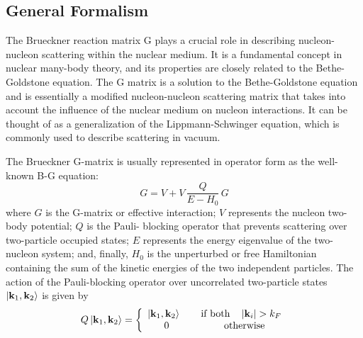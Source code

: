 \documentclass[aps,twocolumn,showpacs,preprintnumbers,amsmath,amssymb,nofootinbib,superscriptaddress,showkeys,noeprint]{revtex4-1}
\newcommand{\nk}{{\bf k}}
\begin{document}
\subsection{General Formalism}\label{sect:general}
The Brueckner reaction matrix G plays a crucial role in describing
nucleon-nucleon scattering within the nuclear medium. It is a
fundamental concept in nuclear many-body theory, and its properties
are closely related to the Bethe-Goldstone equation. The G matrix is a
solution to the Bethe-Goldstone equation and is essentially a modified
nucleon-nucleon scattering matrix that takes into account the
influence of the nuclear medium on nucleon interactions. It can be
thought of as a generalization of the Lippmann-Schwinger equation,
which is commonly used to describe scattering in vacuum.

The Brueckner G-matrix is usually represented in operator form as the
well-known B-G equation:
\begin{equation}\label{G-operator}
G = V + V\, \frac{Q}{E-H_0}\, G
\end{equation}
where $G$ is the G-matrix or effective interaction; $V$ represents the
nucleon two-body potential; $Q$ is the Pauli- blocking operator that
prevents scattering over two-particle occupied states; $E$ represents
the energy eigenvalue of the two-nucleon system; and, finally, $H_0$
is the unperturbed or free Hamiltonian containing the sum of the
kinetic energies of the two independent particles.  The action of the
Pauli-blocking operator over uncorrelated two-particle states
$\left|\nk_1,\nk_2\right\rangle$ is given by
\begin{equation}\label{action_Q_operator}
Q\left|\nk_1,\nk_2\right\rangle=
\left\{
\begin{array}{c}
\left|\nk_1,\nk_2\right\rangle \qquad \textrm{if both} \quad \left|\nk_i\right|>k_F\\
0 \qquad\qquad\quad\;\; \textrm{otherwise}
\end{array}
\right.
\end{equation}
\end{document}
